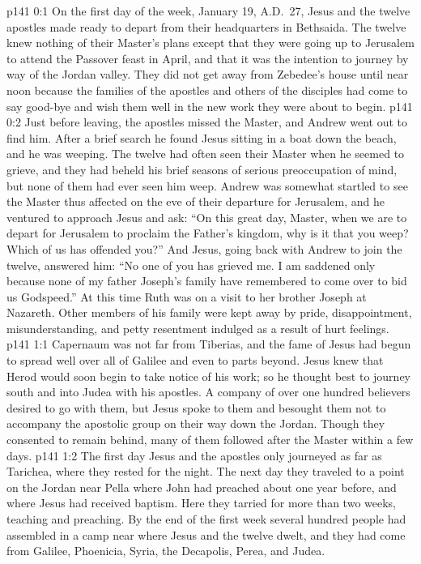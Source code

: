 \author{Midwayer Commission}
\vs p141 0:1 On the first day of the week, January 19, A.D.~27, Jesus and the twelve apostles made ready to depart from their headquarters in Bethsaida. The twelve knew nothing of their Master’s plans except that they were going up to Jerusalem to attend the Passover feast in April, and that it was the intention to journey by way of the Jordan valley. They did not get away from Zebedee’s house until near noon because the families of the apostles and others of the disciples had come to say good\hyp{}bye and wish them well in the new work they were about to begin.\plusone
\vs p141 0:2 Just before leaving, the apostles missed the Master, and Andrew went out to find him. After a brief search he found Jesus sitting in a boat down the beach, and he was weeping. The twelve had often seen their Master when he seemed to grieve, and they had beheld his brief seasons of serious preoccupation of mind, but none of them had ever seen him weep. Andrew was somewhat startled to see the Master thus affected on the eve of their departure for Jerusalem, and he ventured to approach Jesus and ask: “On this great day, Master, when we are to depart for Jerusalem to proclaim the Father’s kingdom, why is it that you weep? Which of us has offended you?” And Jesus, going back with Andrew to join the twelve, answered him: \textcolor{ubdarkred}{“No one of you has grieved me. I am saddened only because none of my father Joseph’s family have remembered to come over to bid us Godspeed.”} At this time Ruth was on a visit to her brother Joseph at Nazareth. Other members of his family were kept away by pride, disappointment, misunderstanding, and petty resentment indulged as a result of hurt feelings.
%
\vs p141 1:1 Capernaum was not far from Tiberias, and the fame of Jesus had begun to spread well over all of Galilee and even to parts beyond. Jesus knew that Herod would soon begin to take notice of his work; so he thought best to journey south and into Judea with his apostles. A company of over one hundred believers desired to go with them, but Jesus spoke to them and besought them not to accompany the apostolic group on their way down the Jordan. Though they consented to remain behind, many of them followed after the Master within a few days.
\vs p141 1:2 The first day Jesus and the apostles only journeyed as far as Tarichea, where they rested for the night. The next day they traveled to a point on the Jordan near Pella where John had preached about one year before, and where Jesus had received baptism. Here they tarried for more than two weeks, teaching and preaching. By the end of the first week several hundred people had assembled in a camp near where Jesus and the twelve dwelt, and they had come from Galilee, Phoenicia, Syria, the Decapolis, Perea, and Judea.

